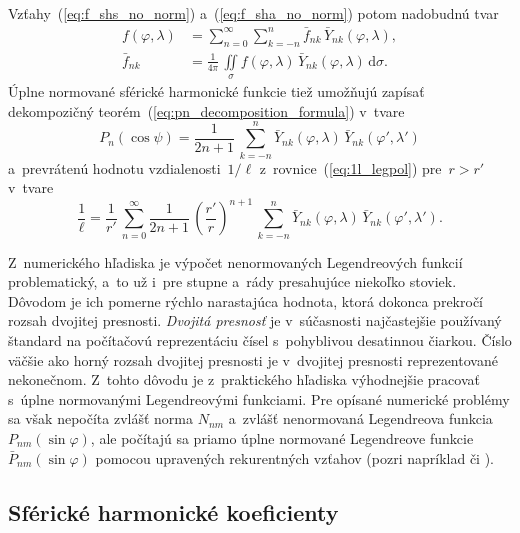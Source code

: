 \documentclass[a4paper, 12pt]{book}
\newcommand{\diff}{\mathrm d}
\begin{document}
Vzťahy~(\ref{eq:f_shs_no_norm}) a~(\ref{eq:f_sha_no_norm}) potom nadobudnú tvar
%
\begin{align}
\label{eq:f_shs}
f(\varphi, \lambda) &= \sum_{n = 0}^\infty \sum_{k = -n}^n \bar{f}_{nk} \,
\bar{Y}_{nk}(\varphi, \lambda){,}\\
%
\label{eq:f_sha}
\bar{f}_{nk} &= \frac{1}{4\pi} \, \iint\limits_{\sigma} f(\varphi, \lambda) \,
\bar{Y}_{nk}(\varphi, \lambda) \, \diff \sigma{.}
\end{align}
%
Úplne normované sférické harmonické funkcie tiež umožňujú zapísať dekompozičný
teorém~(\ref{eq:pn_decomposition_formula}) v~tvare
\parencite{MoritzPhysicalGeodesy}
%
\begin{equation}
P_n(\cos\psi) = \frac{1}{2n + 1} \, \sum_{k = -n}^n \bar{Y}_{nk}(\varphi,
\lambda) \, \bar{Y}_{nk}(\varphi', \lambda')
\end{equation}
%
a~prevrátenú hodnotu vzdialenosti~$1 \slash \ell$ 
z~rovnice~(\ref{eq:1l_legpol}) pre~$r > r'$ v~tvare
%
\begin{equation}
\label{eq:1l_sh}
\frac{1}{\ell} = \frac{1}{r'} \, \sum_{n = 0}^{\infty} \frac{1}{2n + 1} \, 
\left( \frac{r'}{r} \right)^{n + 1} \, \sum_{k = -n}^n \bar{Y}_{nk}(\varphi,
\lambda) \, \bar{Y}_{nk}(\varphi', \lambda'){.}
\end{equation}

Z~numerického hľadiska je výpočet nenormovaných Legendreových funkcií 
problematický, a~to už i~pre stupne a~rády presahujúce niekoľko stoviek.  
Dôvodom je ich pomerne rýchlo narastajúca hodnota, ktorá dokonca prekročí 
rozsah dvojitej presnosti.  \emph{Dvojitá presnosť} je v~súčasnosti 
najčastejšie používaný štandard na počítačovú reprezentáciu čísel s~pohyblivou 
desatinnou čiarkou.  Číslo väčšie ako horný rozsah dvojitej presnosti je 
v~dvojitej presnosti reprezentované nekonečnom.  Z~tohto dôvodu je 
z~praktického hľadiska výhodnejšie pracovať s~úplne normovanými Legendreovými 
funkciami.  Pre opísané numerické problémy sa však nepočíta zvlášť norma 
$N_{nm}$ a~zvlášť nenormovaná Legendreova funkcia $P_{nm}(\sin\varphi)$, ale 
počítajú sa priamo úplne normované Legendreove funkcie 
$\bar{P}_{nm}(\sin\varphi)$ pomocou upravených rekurentných vzťahov (pozri 
napríklad \cite{Holmes2002a} či \cite{Fukushima2012a}).



\subsection{Sférické harmonické koeficienty}
\label{sec:shc_norm}
\end{document}
